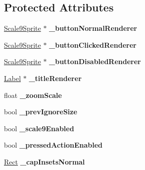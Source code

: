 \subsection*{Protected Attributes}
\begin{DoxyCompactItemize}
\item 
\mbox{\label{classui_1_1Button_abd874fd64ca8309529f8da4f76b019d8}} 
\hyperlink{classui_1_1Scale9Sprite}{Scale9\+Sprite} $\ast$ {\bfseries \+\_\+button\+Normal\+Renderer}
\item 
\mbox{\label{classui_1_1Button_a869f930f183290635bfe0f9eca99cd57}} 
\hyperlink{classui_1_1Scale9Sprite}{Scale9\+Sprite} $\ast$ {\bfseries \+\_\+button\+Clicked\+Renderer}
\item 
\mbox{\label{classui_1_1Button_a54808cd61ceac4366afc892e66c068d0}} 
\hyperlink{classui_1_1Scale9Sprite}{Scale9\+Sprite} $\ast$ {\bfseries \+\_\+button\+Disabled\+Renderer}
\item 
\mbox{\label{classui_1_1Button_a89bc5c784d15e76faf788895076a5911}} 
\hyperlink{classLabel}{Label} $\ast$ {\bfseries \+\_\+title\+Renderer}
\item 
\mbox{\label{classui_1_1Button_a60c86c344f7503fac76153fe0b54122a}} 
float {\bfseries \+\_\+zoom\+Scale}
\item 
\mbox{\label{classui_1_1Button_aa63f8b6a53ef6f74d0c29d435b9b98b5}} 
bool {\bfseries \+\_\+prev\+Ignore\+Size}
\item 
\mbox{\label{classui_1_1Button_aa8cca07f56b08c9d6afb9eb23b90c15a}} 
bool {\bfseries \+\_\+scale9\+Enabled}
\item 
\mbox{\label{classui_1_1Button_af70fb42fc18f21448beb7c2dde582648}} 
bool {\bfseries \+\_\+pressed\+Action\+Enabled}
\item 
\mbox{\label{classui_1_1Button_a78195ade7b9498f25d2c61f32832d72a}} 
\hyperlink{classRect}{Rect} {\bfseries \+\_\+cap\+Insets\+Normal}
\item 
\mbox{\label{classui_1_1Button_a2ff21330054d486bf45c65b6e1cfa96b}} 

\end{DoxyCompactItemize}
